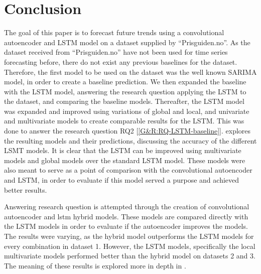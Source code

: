 \section{Conclusion}
\label{section:Discussion:Conclusion}


The goal of this paper is to forecast future trends using a convolutional autoencoder and LSTM model
on a dataset supplied by ``Prisguiden.no''.
As the dataset received from ``Prisguiden.no'' have not been used for time series forecasting before,
there do not exist any previous baselines for the dataset.
Therefore, the first model to be used on the dataset was the well known SARIMA model,
in order to create a baseline prediction.
We then expanded the baseline with the LSTM model, answering the research question 
applying the LSTM to the dataset, and comparing the baseline models.
Thereafter, the LSTM model was expanded and improved using variations of global and local, and univariate and multivariate models
to create comparable results for the LSTM.
This was done to answer the research question RQ2 [\ref{G&R:RQ-LSTM-baseline}].
 explores the resulting models and their predictions, discussing the accuracy of the different LSMT models.
It is clear that the LSTM can be improved using multivariate models and global models over the standard LSTM model.
These models were also meant to serve as a point of comparison with the convolutional autoencoder and LSTM,
in order to evaluate if this model served a purpose and achieved better results.

Answering research question  is attempted through the creation of convolutional autoencoder and lstm hybrid models.
These models are compared directly with the LSTM models in order to evaluate if the autoencoder improves the models.
The results were varying, as the hybrid model outperforms the LSTM models for every combination in dataset 1.
However, the LSTM models, specifically the local multivariate models performed better than the hybrid model on datasets 2 and 3.
The meaning of these results is explored more in depth in .

